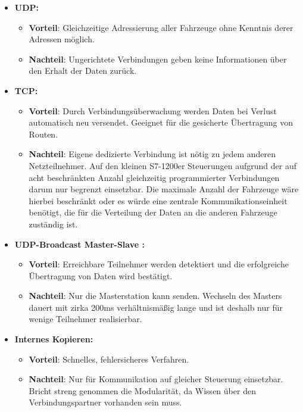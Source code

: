 		\begin{itemize}
			\item \textbf{\ac{UDP}:} 
				\begin{itemize}
					\item \textbf{Vorteil}: Gleichzeitige Adressierung aller Fahrzeuge ohne Kenntnis derer Adressen möglich.
					\item \textbf{Nachteil}: Ungerichtete Verbindungen geben keine Informationen über den Erhalt der Daten zurück.
				\end{itemize}
			\item \textbf{\acs{TCP}:}
				\begin{itemize}
					\item \textbf{Vorteil}: Durch Verbindungsüberwachung werden Daten bei Verlust automatisch neu versendet. Geeignet für die gesicherte Übertragung von Routen.
					\item \textbf{Nachteil}: Eigene dedizierte Verbindung ist nötig zu jedem anderen Netzteilnehmer. Auf den kleinen S7-1200er Steuerungen aufgrund der auf acht beschränkten Anzahl gleichzeitig programmierter Verbindungen \cite{S7-1200} darum nur begrenzt einsetzbar. Die maximale Anzahl der Fahrzeuge wäre hierbei beschränkt oder es würde eine zentrale Kommunikationseinheit benötigt, die für die Verteilung der Daten an die anderen Fahrzeuge zuständig ist.
				\end{itemize}
			\item \textbf{\ac{UDP}-Broadcast Master-Slave \cite{MasterSlaveUDP}:}
				\begin{itemize}
					\item \textbf{Vorteil}: Erreichbare Teilnehmer werden detektiert und die erfolgreiche Übertragung von Daten wird bestätigt.
					\item \textbf{Nachteil}: Nur die Masterstation kann senden. Wechseln des Masters dauert mit zirka 200ms verhältnismäßig lange und ist deshalb nur für wenige Teilnehmer realisierbar. 
				\end{itemize}
			\item \textbf{Internes Kopieren:}
			\begin{itemize}
				\item \textbf{Vorteil}: Schnelles, fehlersicheres Verfahren.
				\item \textbf{Nachteil}: Nur für Kommunikation auf gleicher Steuerung einsetzbar. Bricht streng genommen die Modularität, da Wissen über den Verbindungspartner vorhanden sein muss.
			\end{itemize}
		\end{itemize}
		
